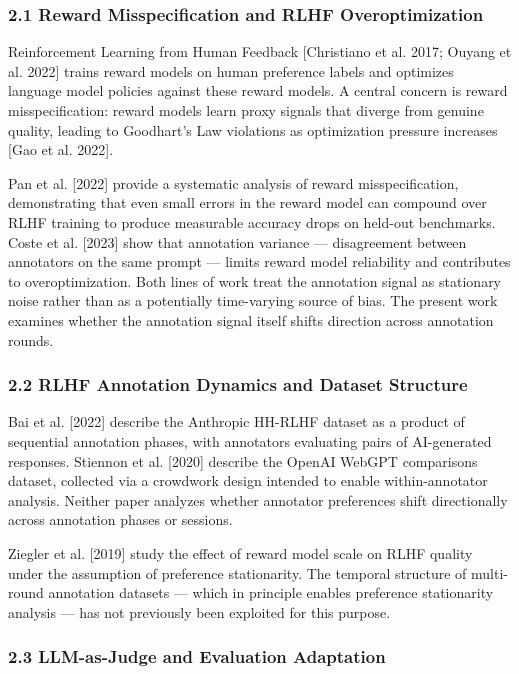 
\subsubsection{2.1 Reward Misspecification and RLHF Overoptimization}

Reinforcement Learning from Human Feedback [Christiano et al. 2017; Ouyang et al. 2022] trains reward models on human preference labels and optimizes language model policies against these reward models. A central concern is reward misspecification: reward models learn proxy signals that diverge from genuine quality, leading to Goodhart's Law violations as optimization pressure increases [Gao et al. 2022].

Pan et al. [2022] provide a systematic analysis of reward misspecification, demonstrating that even small errors in the reward model can compound over RLHF training to produce measurable accuracy drops on held-out benchmarks. Coste et al. [2023] show that annotation variance — disagreement between annotators on the same prompt — limits reward model reliability and contributes to overoptimization. Both lines of work treat the annotation signal as stationary noise rather than as a potentially time-varying source of bias. The present work examines whether the annotation signal itself shifts direction across annotation rounds.

\subsubsection{2.2 RLHF Annotation Dynamics and Dataset Structure}

Bai et al. [2022] describe the Anthropic HH-RLHF dataset as a product of sequential annotation phases, with annotators evaluating pairs of AI-generated responses. Stiennon et al. [2020] describe the OpenAI WebGPT comparisons dataset, collected via a crowdwork design intended to enable within-annotator analysis. Neither paper analyzes whether annotator preferences shift directionally across annotation phases or sessions.

Ziegler et al. [2019] study the effect of reward model scale on RLHF quality under the assumption of preference stationarity. The temporal structure of multi-round annotation datasets — which in principle enables preference stationarity analysis — has not previously been exploited for this purpose.

\subsubsection{2.3 LLM-as-Judge and Evaluation Adaptation}

